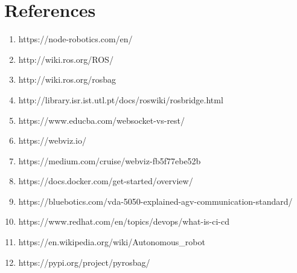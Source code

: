 \chapter{References}
\begin{enumerate}
	\item https://node-robotics.com/en/
	\item http://wiki.ros.org/ROS/
	\item http://wiki.ros.org/rosbag
	\item http://library.isr.ist.utl.pt/docs/roswiki/rosbridge.html
	\item https://www.educba.com/websocket-vs-rest/
	\item https://webviz.io/
	\item https://medium.com/cruise/webviz-fb5f77ebe52b
	\item https://docs.docker.com/get-started/overview/
	\item https://bluebotics.com/vda-5050-explained-agv-communication-standard/
	\item https://www.redhat.com/en/topics/devops/what-is-ci-cd
	\item https://en.wikipedia.org/wiki/Autonomous\_robot
	
	
	
	\item https://pypi.org/project/pyrosbag/
	
	
\end{enumerate}